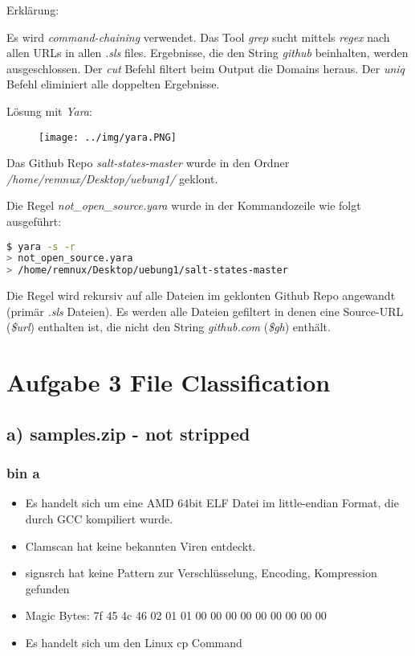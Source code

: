 Erklärung:

Es wird \textit{command-chaining} verwendet.
Das Tool \textit{grep} sucht mittels \textit{regex} nach allen URLs in allen \textit{.sls} files.
Ergebnisse, die den String \textit{github} beinhalten, werden ausgeschlossen.
Der \textit{cut} Befehl filtert beim Output die Domains heraus.
Der \textit{uniq} Befehl eliminiert alle doppelten Ergebnisse.

\newpage

Lösung mit \textit{Yara}:

\begin{figure} [!ht]
\centering
\texttt{[image: ../img/yara.PNG]}
\end{figure}

Das Github Repo \textit{salt-states-master} wurde in den Ordner \textit{/home/remnux/Desktop/uebung1/} geklont.

Die Regel \textit{not\_open\_source.yara} wurde in der Kommandozeile wie folgt ausgeführt:

\begin{lstlisting}[language=bash]
$ yara -s -r
> not_open_source.yara
> /home/remnux/Desktop/uebung1/salt-states-master
\end{lstlisting}

Die Regel wird rekursiv auf alle Dateien im geklonten Github Repo angewandt (primär \textit{.sls} Dateien). Es werden alle Dateien gefiltert in denen eine Source-URL (\textit{\$url}) enthalten ist, die nicht den String \textit{github.com} (\textit{\$gh}) enthält.

\newpage

\section*{Aufgabe 3 File Classification}

\subsection*{a) samples.zip - not stripped}

\subsubsection*{bin a}

\begin{itemize}
    \item Es handelt sich um eine AMD 64bit ELF Datei im little-endian Format, die durch GCC kompiliert wurde.
    \item Clamscan hat keine bekannten Viren entdeckt.
    \item signsrch hat keine Pattern zur Verschlüsselung, Encoding, Kompression gefunden
    \item Magic Bytes: 7f 45 4c 46 02 01 01 00 00 00 00 00 00 00 00 00
    \item Es handelt sich um den Linux cp Command
\end{itemize}

